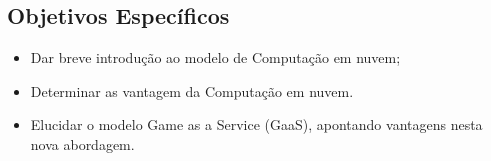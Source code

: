 \begin{justify}
    \section{Objetivos Específicos}

    \begin{itemize}
        \item Dar breve introdução ao modelo de Computação em nuvem;
        \item Determinar as vantagem da Computação em nuvem.
        \item Elucidar o modelo Game as a Service (GaaS), apontando vantagens nesta nova abordagem.
    \end{itemize}

\end{justify}
